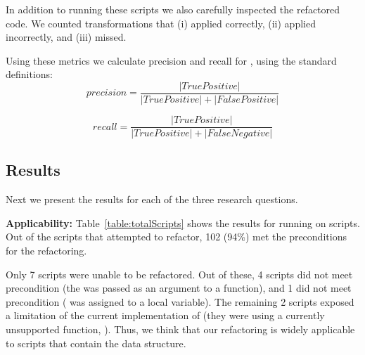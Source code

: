 \documentclass[preprint]{sigplanconf}
\begin{document}
In addition to running these \numManual scripts we also carefully inspected the refactored code. We counted transformations that \tool
(i) applied correctly, (ii) applied incorrectly, and (iii) missed. 
 
 Using these metrics we calculate precision and recall for \tool, using the standard definitions:
\[precision = \frac{|True Positive|}{|True Positive|+|False Positive|}\]

\[recall = \frac{|True Positive|}{|True Positive|+|False Negative|}\]

\subsection{Results}

Next we present the results for each of the three research questions.


\textbf{Applicability: } 
Table~\ref{table:totalScripts} shows the results for running \tool on \numScripts scripts. 
Out of the \numScripts scripts that \tool attempted to refactor, 102 (94\%) met the preconditions for the refactoring.

Only 7 scripts were unable to be refactored. Out of these, 4 scripts did not meet precondition \POne (the \NC{} was passed as an argument to a function), and 1 did not meet precondition \PTwo (\NC{} was assigned to a local variable). The remaining 2 scripts exposed a limitation of the current implementation of \tool (they were using a currently unsupported function, ). 
Thus, we think that our refactoring is widely applicable to \TD scripts that contain the \NC{} data structure.  
\end{document}
